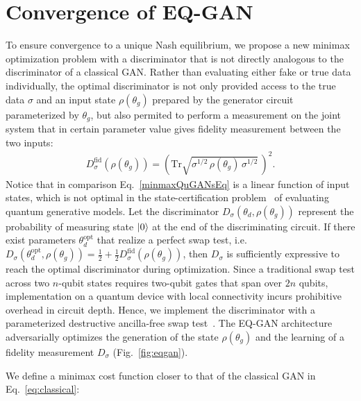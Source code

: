 \documentclass[prl,superscriptaddress,twocolumn]{revtex4}
\makeatletter
\newcommand{\sket}[1]{{\ensuremath{\lvert#1\rangle}}}
\newcommand{\lket}[1]{{\ensuremath{\left\lvert#1\right\rangle}}}
\newcommand{\ket}[1]{\if@display\lket{#1}\else\sket{#1}\fi}
\theoremstyle{plain}
\theoremstyle{definition}
\makeatother
\begin{document}
\section{Convergence of EQ-GAN}%
To ensure convergence to a unique Nash equilibrium, we propose a new minimax optimization problem with a discriminator that is not directly analogous to the discriminator of a classical GAN. Rather than evaluating either fake or true data individually, the optimal discriminator is not only provided access to the true data $\sigma$ and an input state $\rho(\theta_g)$ prepared by the generator circuit parameterized by $\theta_g$,  but also permited to perform a measurement on the joint system that in certain parameter value gives fidelity measurement between the two inputs:
\begin{align}
D_\sigma^\mathrm{fid}(\rho(\theta_g)) = \left(\text{Tr}\sqrt{ \sigma^{1/2} \, \rho(\theta_g) \, \sigma^{1/2}} \, \right)^2.
\end{align} Notice that in comparison Eq.~\ref{minmaxQuGANsEq} is a linear function of input states, which is not optimal in the state-certification problem~\cite{buadescu2019quantum} of evaluating quantum generative models.
Let the discriminator $D_\sigma(\theta_d, \rho(\theta_g))$ represent the probability of measuring state $\ket{0}$ at the end of the discriminating circuit. If there exist parameters $\theta_d^\mathrm{opt}$ that realize a perfect swap test, i.e. $D_\sigma(\theta_d^\mathrm{opt}, \rho(\theta_g)) = \frac{1}{2} + \frac{1}{2}D_\sigma^\mathrm{fid}(\rho(\theta_g))$, then $D_\sigma$ is sufficiently expressive to reach the optimal discriminator during optimization. 
Since a traditional swap test across two $n$-qubit states requires two-qubit gates that span over $2n$ qubits, implementation on a quantum device with local connectivity incurs prohibitive overhead in circuit depth. Hence, we implement the discriminator with a parameterized destructive ancilla-free swap test~\cite{PhysRevA.87.052330}. The EQ-GAN architecture adversarially optimizes the generation of the state $\rho(\theta_g)$ and the learning of a fidelity measurement $D_\sigma$ (Fig.~\ref{fig:eqgan}).

We define a minimax cost function closer to that of the classical GAN in Eq.~\ref{eq:classical}:
\end{document}
